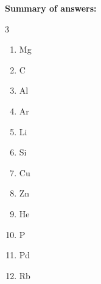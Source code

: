 \begin{exercise}
\begin{solu}
        \textbf{Summary of answers:}
        \begin{multicols}{3}
            \begin{enumerate}[label=\letraminuscula]
                \item Mg
                \item C
                \item Al
                \item Ar
                \item Li
                \item Si
                \item Cu
                \item Zn
                \item He
                \item P
                \item Pd
                \item Rb
            \end{enumerate}
        \end{multicols}
    \end{solu}
\end{exercise}

